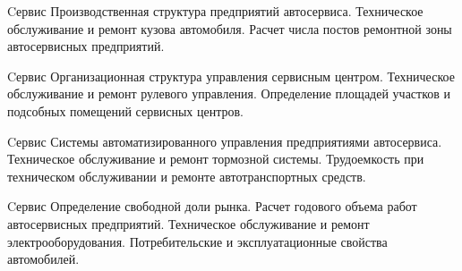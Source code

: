 \documentclass[
	11pt,
	a4paper,
	]
	{article}
\begin{document}
\begin{minipage}[t][\miniH]{\miniL}\centering
	 {Cервис}
		{
			Производственная структура предприятий автосервиса.
		}{
			Техническое обслуживание и ремонт кузова автомобиля.
		}{
			Расчет числа постов ремонтной зоны автосервисных предприятий.
		}
	\lowGE
\end{minipage}





\begin{minipage}[t][\miniH]{\miniL}\centering
	 {Cервис}
		{
			Организационная структура управления сервисным центром.
		}{
			Техническое обслуживание и ремонт рулевого управления.
		}{
			Определение площадей участков и подсобных помещений сервисных центров.
		}
	\lowGE
\end{minipage}

\vfill



\begin{minipage}[t][\miniH]{\miniL}\centering
	 {Cервис}
		{
			Системы автоматизированного управления предприятиями автосервиса.
		}{
			Техническое обслуживание и ремонт тормозной системы.
		}{
			Трудоемкость при техническом обслуживании и ремонте автотранспортных средств.
		}
	\lowGE
\end{minipage}

\vfill



\begin{minipage}[t][\miniH]{\miniL}\centering
	 {Cервис}
		{
			Определение свободной доли рынка. Расчет годового объема работ автосервисных предприятий.
		}{
			Техническое обслуживание и ремонт электрооборудования.
		}{
			Потребительские и эксплуатационные свойства автомобилей.
		}
	\lowGE
\end{minipage}
\end{document}
